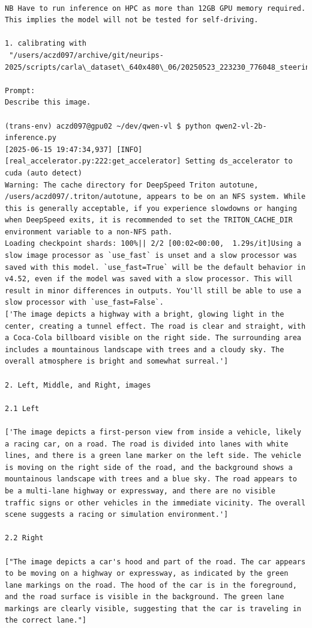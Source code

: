 \begin{verbatim}

NB Have to run inference on HPC as more than 12GB GPU memory required.
This implies the model will not be tested for self-driving.

1. calibrating with 
 "/users/aczd097/archive/git/neurips-2025/scripts/carla\_dataset\_640x480\_06/20250523_223230_776048_steering_0.0000.jpg"

Prompt:
Describe this image.

(trans-env) aczd097@gpu02 ~/dev/qwen-vl $ python qwen2-vl-2b-inference.py 
[2025-06-15 19:47:34,937] [INFO] [real_accelerator.py:222:get_accelerator] Setting ds_accelerator to cuda (auto detect)
Warning: The cache directory for DeepSpeed Triton autotune, /users/aczd097/.triton/autotune, appears to be on an NFS system. While this is generally acceptable, if you experience slowdowns or hanging when DeepSpeed exits, it is recommended to set the TRITON_CACHE_DIR environment variable to a non-NFS path.
Loading checkpoint shards: 100%|| 2/2 [00:02<00:00,  1.29s/it]Using a slow image processor as `use_fast` is unset and a slow processor was saved with this model. `use_fast=True` will be the default behavior in v4.52, even if the model was saved with a slow processor. This will result in minor differences in outputs. You'll still be able to use a slow processor with `use_fast=False`.
['The image depicts a highway with a bright, glowing light in the center, creating a tunnel effect. The road is clear and straight, with a Coca-Cola billboard visible on the right side. The surrounding area includes a mountainous landscape with trees and a cloudy sky. The overall atmosphere is bright and somewhat surreal.']  

2. Left, Middle, and Right, images

2.1 Left

['The image depicts a first-person view from inside a vehicle, likely a racing car, on a road. The road is divided into lanes with white lines, and there is a green lane marker on the left side. The vehicle is moving on the right side of the road, and the background shows a mountainous landscape with trees and a blue sky. The road appears to be a multi-lane highway or expressway, and there are no visible traffic signs or other vehicles in the immediate vicinity. The overall scene suggests a racing or simulation environment.']

2.2 Right

["The image depicts a car's hood and part of the road. The car appears to be moving on a highway or expressway, as indicated by the green lane markings on the road. The hood of the car is in the foreground, and the road surface is visible in the background. The green lane markings are clearly visible, suggesting that the car is traveling in the correct lane."]


\end{verbatim}

